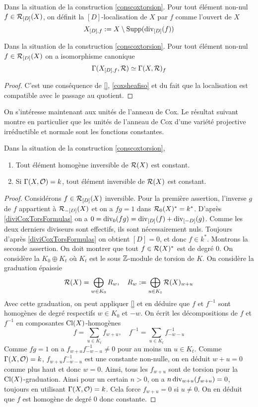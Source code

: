 \begin{defn}
Dans la situation de la construction \ref{conscoxtorsion}. Pour tout élément non-nul $f\in\mathcal{R}_{[D]}(X)$, on définit la $[D]$-localisation de $X$ par $f$ comme l'ouvert de $X$
$$X_{[D],f}:=X\setminus\operatorname{Supp}(\operatorname{div}_{[D]}(f))$$
\end{defn}

\begin{prop}
Dans la situation de la construction \ref{conscoxtorsion}. Pour tout élément non-nul $f\in\mathcal{R}_{[D]}(X)$ on a isomorphisme canonique
$$\Gamma(X_{[D],f},\mathcal{R})\simeq \Gamma(X,\mathcal{R})_f$$
\end{prop}
\begin{proof}
C'est une conséquence de \ref{}, \ref{coxsheafiso} et du fait que la localisation est compatible avec le passage au quotient.
\end{proof}

On s'intéresse maintenant aux unités de l'anneau de Cox. Le résultat suivant montre en particulier que les unités de l'anneau de Cox d'une variété projective irréductible et normale sont les fonctions constantes.

\begin{prop}
Dans la situation de la construction \ref{conscoxtorsion},
\begin{enumerate}
\item Tout élément homogène inversible de $\mathcal{R}(X)$ est constant.
\item Si $\Gamma(X, \mathcal{O})=k$, tout élément inversible de $\mathcal{R}(X)$ est constant.
\end{enumerate}
\end{prop}
\begin{proof}
Considérons $f\in\mathcal{R}_{[D]}(X)$ inversible. Pour la première assertion, l'inverse $g$ de $f$ appartient à $\mathcal{R}_{-[D]}(X)$ et on a $fg=1$ dans $\mathcal{R}_0(X)^*=k^*$. D'après \ref{diviCoxTorsFormulas} on a $0=\operatorname{div}_0(fg)=\operatorname{div}_{[D]}(f)+\operatorname{div}_{[-D]}(g)$. Comme les deux derniers diviseurs sont effectifs, ils sont nécessairement nuls. Toujours d'après \ref{diviCoxTorsFormulas} on obtient $[D]=0$, et donc $f\in k^*$.
Montrons la seconde assertion. On doit montrer que tout $f\in\mathcal{R}(X)^*$ est de degré $0$. On considère la $K_0\oplus K_t$ où $K_t$ est le sous $\mathbb{Z}$-module de torsion de $K$.
On considère la graduation épaissie 
$$\mathcal{R}(X)=\bigoplus_{w\in K_0}R_w,\,\,\,\,\,\, R_w:=\bigoplus_{u\in K_t}\mathcal{R}(X)_{w+u}$$
Avec cette graduation, on peut appliquer \ref{} et en déduire que $f$ et $f^{-1}$ sont homogènes de degré respectifs $w\in K_0$ et $-w$. On écrit les décompositions de $f$ et $f^{-1}$ en composantes $\operatorname{Cl}(X)$-homogènes
$$f=\sum_{u\in K_t}f_{w+u},\,\,\,\,\,\, f^{-1}=\sum_{u\in K_t}f^{-1}_{-w-u}$$
Comme $fg=1$ on a $f_{w+u}f^{-1}_{-w-u}\neq 0$ pour au moins un $u\in K_t$. Comme $\Gamma(X, \mathcal{O})=k$, $f_{w+u}f^{-1}_{-w-u}$ est une constante non-nulle, on en déduit $w+u=0$ comme plus haut et donc $w=0$. Ainsi, tous les $f_{w+u}$ sont de torsion pour la $\operatorname{Cl}(X)$-graduation. Ainsi pour un certain $n>0$, on a $n\operatorname{div}_{w+u}(f_{w+u})=0$, toujours en utilisant $\Gamma(X, \mathcal{O})=k$. Cela force $f_{w+u}=0$ si $u\neq 0$. On en déduit que $f$ est homogène de degré $0$ donc constante.
\end{proof}

